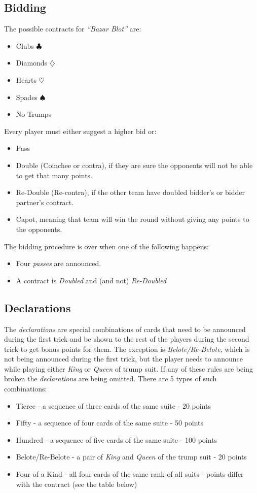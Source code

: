\subsection{Bidding}
The possible contracts for \textit{``Bazar Blot''} are:
\begin{itemize}
    \item Clubs $\clubsuit$
    \item Diamonds $\diamondsuit$
    \item Hearts $\heartsuit$
    \item Spades $\spadesuit$
    \item No Trumps
\end{itemize}
Every player must either suggest a higher bid or:
\begin{itemize}
    \item Pass
    \item Double (Coinchee or contra), if they are sure the opponents will not be able to get that many points.
    \item Re-Double (Re-contra), if the other team have doubled bidder's or bidder partner's contract.
    \item Capot, meaning that team will win the round without giving any points to the opponents.
\end{itemize}

The bidding procedure is over when one of the following happens:
\begin{itemize}
    \item Four \textit{passes} are announced.
    \item A contract is \textit{Doubled} and (and not) \textit{Re-Doubled}
\end{itemize}
\subsection{Declarations}

\hspace{\parindent} The \textit{declarations} are special combinations of cards that need to be announced during the first trick and be shown to the rest of the players during the second trick to get bonus points for them.
The exception is \textit{Belote/Re-Belote}, which is not being announced during the first trick, but the player needs to announce while playing either \textit{King} or \textit{Queen} of trump suit.
If any of these rules are being broken the \textit{declarations} are being omitted.
There are 5 types of such combinations:
\begin{itemize}
    \item Tierce - a sequence of three cards of the same suite - 20 points
    \item Fifty - a sequence of four cards of the same suite - 50 points
    \item Hundred - a sequence of five cards of the same suite - 100 points
    \item Belote/Re-Belote - a pair of \textit{King} and \textit{Queen} of the trump suit -  20 points
    \item Four of a Kind - all four cards of the same rank of all suits - points differ with the contract (see the table below)
\end{itemize}

